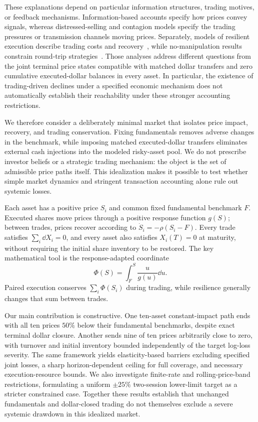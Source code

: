 \documentclass[review,hidelinks,onefignum,onetabnum]{siamonline250211}
\begin{document}
These explanations depend on particular information structures, trading motives, or feedback mechanisms. Information-based accounts specify how prices convey signals, whereas distressed-selling and contagion models specify the trading pressures or transmission channels moving prices. Separately, models of resilient execution describe trading costs and recovery~\citep{ObizhaevaWang2013,AlfonsiSchied2010}, while no-manipulation results constrain round-trip strategies~\citep{HubermanStanzl2004,Gatheral2010}. Those analyses address different questions from the joint terminal price states compatible with matched dollar transfers and zero cumulative executed-dollar balances in every asset. In particular, the existence of trading-driven declines under a specified economic mechanism does not automatically establish their reachability under these stronger accounting restrictions.

We therefore consider a deliberately minimal market that isolates price impact, recovery, and trading conservation. Fixing fundamentals removes adverse changes in the benchmark, while imposing matched executed-dollar transfers eliminates external cash injections into the modeled risky-asset pool. We do not prescribe investor beliefs or a strategic trading mechanism: the object is the set of admissible price paths itself. This idealization makes it possible to test whether simple market dynamics and stringent transaction accounting alone rule out systemic losses.

Each asset has a positive price $S_i$ and common fixed fundamental benchmark $F$. Executed shares move prices through a positive response function $g(S)$; between trades, prices recover according to $\dot S_i=-\rho(S_i-F)$. Every trade satisfies $\sum_i\dd X_i=0$, and every asset also satisfies $X_i(T)=0$ at maturity, without requiring the initial share inventory to be restored. The key mathematical tool is the response-adapted coordinate
\begin{equation}\label{eq:phi-intro}
\Phi(S)=\int_F^S\frac{u}{g(u)}\dd u.
\end{equation}
Paired execution conserves $\sum_i\Phi(S_i)$ during trading, while resilience generally changes that sum between trades.

Our main contribution is constructive. One ten-asset constant-impact path ends with all ten prices $50\%$ below their fundamental benchmarks, despite exact terminal dollar closure. Another sends nine of ten prices arbitrarily close to zero, with turnover and initial inventory bounded independently of the target log-loss severity. The same framework yields elasticity-based barriers excluding specified joint losses, a sharp horizon-dependent ceiling for full coverage, and necessary execution-resource bounds. We also investigate finite-rate and rolling-price-band restrictions, formulating a uniform $\pm25\%$ two-session lower-limit target as a stricter constrained case. Together these results establish that unchanged fundamentals and dollar-closed trading do not themselves exclude a severe systemic drawdown in this idealized market.
\end{document}
